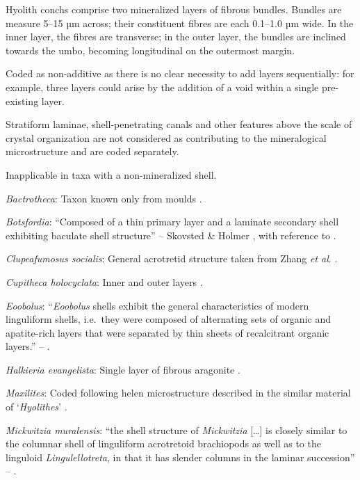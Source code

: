 \documentclass[openany]{book}
\begin{document}
Hyolith conchs comprise two mineralized layers of fibrous bundles.
Bundles are measure 5--15 µm across; their constituent fibres are each
0.1--1.0 µm wide. In the inner layer, the fibres are transverse; in the
outer layer, the bundles are inclined towards the umbo, becoming
longitudinal on the outermost margin.

Coded as non-additive as there is no clear necessity to add layers
sequentially: for example, three layers could arise by the addition of a
void within a single pre-existing layer.

Stratiform laminae, shell-penetrating canals and other features above
the scale of crystal organization are not considered as contributing to
the mineralogical microstructure and are coded separately.

Inapplicable in taxa with a non-mineralized shell.

\hypertarget{Bactrotheca-coding-132}{}
\emph{Bactrotheca}: Taxon known only from moulds \citep{Valent2012}.

\hypertarget{Botsfordia-coding-132}{}
\emph{Botsfordia}: ``Composed of a thin primary layer and a laminate
secondary shell exhibiting baculate shell structure'' -- Skovsted \&
Holmer \citeyearpar{Skovsted2005EarlyCambrian}, with reference to
\citet{Skovsted2003EarlyCambrian}.

\hypertarget{Clupeafumosus_socialis-coding-132}{}
\emph{Clupeafumosus socialis}: General acrotretid structure taken from
Zhang \emph{et al}. \citeyearpar{Zhang2016Epithelialcell}.

\hypertarget{Cupitheca_holocyclata-coding-132}{}
\emph{Cupitheca holocyclata}: Inner and outer layers
\citep{Vendrasco2017}.

\hypertarget{Eoobolus-coding-132}{}
\emph{Eoobolus}: ``\emph{Eoobolus} shells exhibit the general
characteristics of modern linguliform shells, i.e.~they were composed of
alternating sets of organic and apatite-rich layers that were separated
by thin sheets of recalcitrant organic layers.'' --
\citet{Balthasar2007Anearly}.

\hypertarget{Halkieria_evangelista-coding-132}{}
\emph{Halkieria evangelista}: Single layer of fibrous aragonite
\citep{Porter2008}.

\hypertarget{Maxilites-coding-132}{}
\emph{Maxilites}: Coded following helen microstructure described in the
similar material of `\emph{Hyolithes}' \citep{MartiMus2007}.

\hypertarget{Mickwitzia_muralensis-coding-132}{}
\emph{Mickwitzia muralensis}: ``the shell structure of \emph{Mickwitzia}
{[}\ldots{}{]} is closely similar to the columnar shell of linguliform
acrotretoid brachiopods as well as to the linguloid
\emph{Lingulellotreta}, in that it has slender columns in the laminar
succession'' -- \citet{Williams2007Supplement}.
\end{document}
